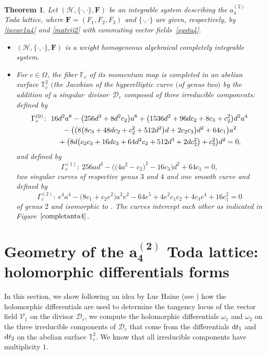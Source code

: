 \documentclass[pdftex]{sigma}
\numberwithin{equation}{section}
\newtheorem{Theorem}{Theorem}[section]
\begin{document}
\begin{Theorem}
Let $(\mathcal{H}, \{\cdot,\cdot\},\mathbf{F})$ be an
integrable system  describing the $a_4^{(2)}$ Toda lattice, where
$\mathbf{F}=(F_1,F_2,F_3)$ and $\{\cdot,\cdot\}$ are
given, respectively, by \eqref{invar1a4} and \eqref{matrij2} with
commuting vector fields~\eqref{systa4}.
\begin{itemize}\itemsep=0pt
 \item [$(i)$] $(\mathcal{H}, \{\cdot,\cdot\},\mathbf{F})$ is a weight homogeneous
 algebraical completely integrable system.
 \item [$(ii)$] For $c\in \Omega$, the fiber $\mathbb{F}_c$ of its
 momentum map is completed in an abelian surface
 $\mathbb{T}^2_c$ $\bigl($the Jacobian of the hyperelliptic curve $($of genus two$)$ 
 by the addition of a singular~divisor~$\mathcal{D}_c$
 composed of three irreducible components:  defined by
 \begin{gather*}
 \Gamma_c^{(0)}\colon \ 16d^2a^8-\bigl(256d^3+8d^2c_2\bigr)a^6+ \bigl(1536d^2+96dc_2+8c_3+c_2^2\bigr)d^2a^4\\
 \hphantom{\Gamma_c^{(0)}\colon}{} \
 -\bigl(\bigl(8\bigl(8c_3+48dc_2+c_2^2+512d^2\bigr)d+2c_2c_3\bigr)d^2+64c_1\bigr)a^2 \\
 \hphantom{\Gamma_c^{(0)}\colon}{} \
 +\bigl(8d\bigl(c_2c_3+ 16dc_3+64d^2c_2 +512d^3+2dc_2^2\bigr)+c_3^2\bigr)d^2=0,
\end{gather*}
 and
  defined by
\begin{equation*}
 \Gamma_c^{(1)}\colon \ 256ad^3-\bigl(\bigl(4a^2-c_2\bigr)^2-16c_3\bigr)d^2+64c_1=0,
\end{equation*}
two singular curves of respective genus $3$ and $4$ and one
 smooth curve and  defined by
\begin{equation*}
 \Gamma_c^{(2)}\colon \ e^4a^4-\bigl(8c_1+c_2e^2\bigr)a^2e^2-64e^5+4e^2c_1c_2+4c_3e^4+16c_1^2=0
\end{equation*}
 of genus $2$ and isomorphic to \smash{$\overline{\Gamma}_c^{(2)} $}. The curves intercept each other as indicated in Figure~$\ref{completanta4}$.
\end{itemize}
\end{Theorem}
\section[Geometry of the a\_4\^{}(2) Toda lattice: holomorphic differentials forms]{Geometry of the $\boldsymbol{a_4^{(2)}}$ Toda lattice:\\ holomorphic differentials forms}\label{sec4}
In this section, we show following an idea by Luc Haine (see
\cite{Haine}) how the holomorphic differentials are used to
determine the tangency locus of the vector field $\mathcal{V}_1$ on
the divisor $\mathcal{D}_c$, we compute the holomorphic
differentials $\omega_1$ and $\omega_2$ on the three irreducible
components of $\mathcal{D}_c$ that come from the differentials
${\rm d}t_1$ and ${\rm d}t_2$ on the abelian surface $\mathbb{T}^2_c$. We know
that all irreducible components have multiplicity $1$.
\end{document}
